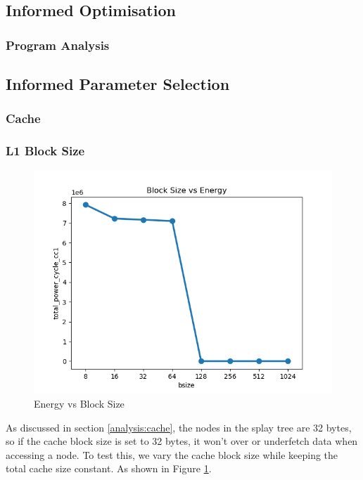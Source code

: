 \documentclass{article}
\begin{document}
\begin{multicols}{2}

  \subsection{Informed Optimisation}

  \subsubsection{Program Analysis}


  \subsection{Informed Parameter Selection}

  \subsubsection{Cache}
  \subsubsection{L1 Block Size}
  \begin{figure}[H]
    \centering
    \includegraphics[width=\linewidth]{./assets/l1bsize_vs_energy.png}
    \caption{Energy vs Block Size}
    \label{fig:bsize_vs_energy}
  \end{figure}
  As discussed in section \ref{analysis:cache}, the nodes in the splay tree are 32 bytes, so if the cache block size is set to 32 bytes, it won't over or underfetch data when accessing a node. To test this, we vary the cache block size while keeping the total cache size constant. As shown in Figure \ref{fig:bsize_vs_energy}.



\end{multicols}
\end{document}
